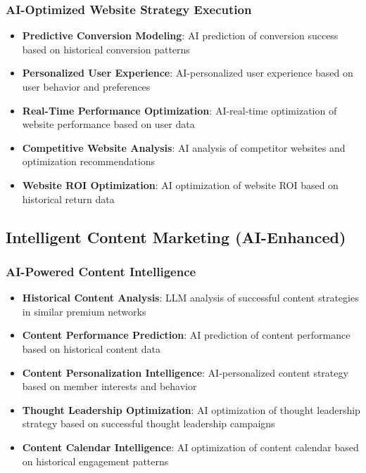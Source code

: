 \subsubsection{AI-Optimized Website Strategy Execution}

\begin{itemize}
    \item \textbf{Predictive Conversion Modeling}: AI prediction of conversion success based on historical conversion patterns
    \item \textbf{Personalized User Experience}: AI-personalized user experience based on user behavior and preferences
    \item \textbf{Real-Time Performance Optimization}: AI-real-time optimization of website performance based on user data
    \item \textbf{Competitive Website Analysis}: AI analysis of competitor websites and optimization recommendations
    \item \textbf{Website ROI Optimization}: AI optimization of website ROI based on historical return data
\end{itemize}

\subsection{Intelligent Content Marketing (AI-Enhanced)}

\subsubsection{AI-Powered Content Intelligence}

\begin{itemize}
    \item \textbf{Historical Content Analysis}: LLM analysis of successful content strategies in similar premium networks
    \item \textbf{Content Performance Prediction}: AI prediction of content performance based on historical content data
    \item \textbf{Content Personalization Intelligence}: AI-personalized content strategy based on member interests and behavior
    \item \textbf{Thought Leadership Optimization}: AI optimization of thought leadership strategy based on successful thought leadership campaigns
    \item \textbf{Content Calendar Intelligence}: AI optimization of content calendar based on historical engagement patterns
\end{itemize}

